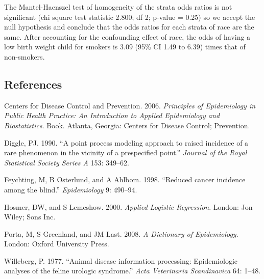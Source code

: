 \documentclass[
]{article}
\newlength{\cslhangindent}
\newenvironment{cslreferences}%
  {\setlength{\parindent}{0pt}%
  \everypar{\setlength{\hangindent}{\cslhangindent}}\ignorespaces}%
  {\par}
\begin{document}
The Mantel-Haenszel test of homogeneity of the strata odds ratios is not
significant (chi square test statistic 2.800; df 2; p-value = 0.25) so
we accept the null hypothesis and conclude that the odds ratios for each
strata of race are the same. After accounting for the confounding effect
of race, the odds of having a low birth weight child for smokers is 3.09
(95\% CI 1.49 to 6.39) times that of non-smokers.

\hypertarget{references}{%
\subsection*{References}\label{references}}

\hypertarget{refs}{}
\begin{cslreferences}
\leavevmode\hypertarget{ref-cdc:2006}{}%
Centers for Disease Control and Prevention. 2006. \emph{Principles of
Epidemiology in Public Health Practice: An Introduction to Applied
Epidemiology and Biostatistics}. Book. Atlanta, Georgia: Centers for
Disease Control; Prevention.

\leavevmode\hypertarget{ref-diggle:1990}{}%
Diggle, PJ. 1990. ``A point process modeling approach to raised
incidence of a rare phenomenon in the vicinity of a prespecified
point.'' \emph{Journal of the Royal Statistical Society Series A} 153:
349--62.

\leavevmode\hypertarget{ref-feychting_et_al:1998}{}%
Feychting, M, B Osterlund, and A Ahlbom. 1998. ``Reduced cancer
incidence among the blind.'' \emph{Epidemiology} 9: 490--94.

\leavevmode\hypertarget{ref-hosmer_lemeshow:2000}{}%
Hosmer, DW, and S Lemeshow. 2000. \emph{Applied Logistic Regression}.
London: Jon Wiley; Sons Inc.

\leavevmode\hypertarget{ref-porta_et_al:2008}{}%
Porta, M, S Greenland, and JM Last. 2008. \emph{A Dictionary of
Epidemiology}. London: Oxford University Press.

\leavevmode\hypertarget{ref-willeberg:1977}{}%
Willeberg, P. 1977. ``Animal disease information processing:
Epidemiologic analyses of the feline urologic syndrome.'' \emph{Acta
Veterinaria Scandinavica} 64: 1--48.
\end{cslreferences}
\end{document}

